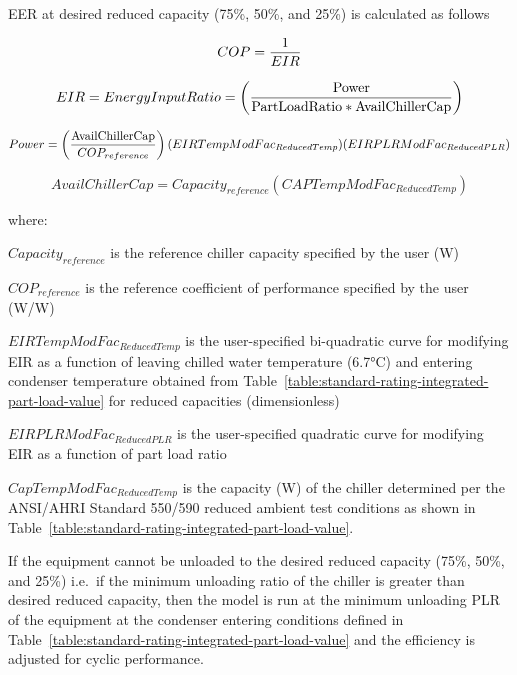 EER at desired reduced capacity (75\%, 50\%, and 25\%) is calculated as follows

\begin{equation}
COP = \frac{{\rm{1}}}{{EIR}}
\end{equation}

\begin{equation}
EIR = EnergyInputRatio = \left( {\frac{{{\rm{Power }}}}{{{\rm{PartLoadRatio * AvailChillerCap}}}}} \right)
\end{equation}

\begin{equation}
Power = \left( {\frac{{{\rm{AvailChillerCap}}}}{{CO{P_{reference}}}}} \right)(EIRTempModFa{c_{ReducedTemp}})(EIRPLRModFa{c_{ReducedPLR}})
\end{equation}

\begin{equation}
AvailChillerCap = Capacit{y_{reference}}(CAPTempModFa{c_{ReducedTemp}})
\end{equation}

where:

\(Capacit{y_{reference}}\) is the reference chiller capacity specified by the user (W)

\(CO{P_{reference}}\) is the reference coefficient of performance specified by the user (W/W)

\(EIRTempModFa{c_{ReducedTemp}}\) is the user-specified bi-quadratic curve for modifying EIR as a function of leaving chilled water temperature (6.7°C) and entering condenser temperature obtained from Table~\ref{table:standard-rating-integrated-part-load-value} for reduced capacities (dimensionless)

\(EIRPLRModFa{c_{ReducedPLR}}\) is the user-specified quadratic curve for modifying EIR as a function of part load ratio

\(CapTempModFa{c_{ReducedTemp}}\) is the capacity (W) of the chiller determined per the ANSI/AHRI Standard 550/590 reduced ambient test conditions as shown in Table~\ref{table:standard-rating-integrated-part-load-value}.

If the equipment cannot be unloaded to the desired reduced capacity (75\%, 50\%, and 25\%) i.e.~if the minimum unloading ratio of the chiller is greater than desired reduced capacity, then the model is run at the minimum unloading PLR of the equipment at the condenser entering conditions defined in Table~\ref{table:standard-rating-integrated-part-load-value} and the efficiency is adjusted for cyclic performance.


